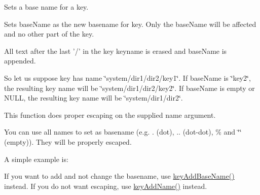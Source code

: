 Sets a base name for a key. 

Sets {\ttfamily base\+Name} as the new basename for {\ttfamily key}. Only the base\+Name will be affected and no other part of the key.

All text after the last {\ttfamily '/'} in the {\ttfamily key} keyname is erased and {\ttfamily base\+Name} is appended.

So let us suppose {\ttfamily key} has name {\ttfamily \char`\"{}system/dir1/dir2/key1\char`\"{}}. If {\ttfamily base\+Name} is {\ttfamily \char`\"{}key2\char`\"{}}, the resulting key name will be {\ttfamily \char`\"{}system/dir1/dir2/key2\char`\"{}}. If {\ttfamily base\+Name} is empty or N\+U\+L\+L, the resulting key name will be {\ttfamily \char`\"{}system/dir1/dir2\char`\"{}}.

This function does proper escaping on the supplied name argument.

You can use all names to set as basename (e.\+g. . (dot), .. (dot-\/dot), \% and \char`\"{}\char`\"{} (empty)). They will be properly escaped.

A simple example is\+: 
 If you want to add and not change the basename, use \hyperlink{group__keyname_gaa942091fc4bd5c2699e49ddc50829524}{key\+Add\+Base\+Name()} instead. If you do not want escaping, use \hyperlink{group__keyname_gaa70593a2c772c4b7bc33423b9b10a270}{key\+Add\+Name()} instead.

